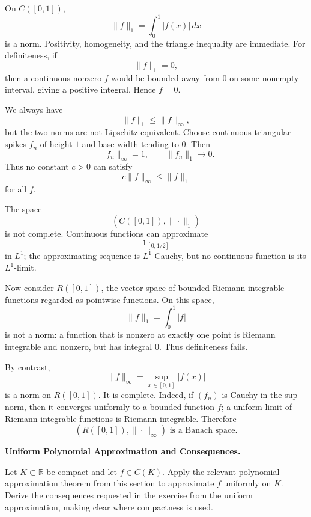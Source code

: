 \begin{solution}
On \(C([0,1])\),
\[
\|f\|_1=\int_0^1|f(x)|\,dx
\]
is a norm. Positivity, homogeneity, and the triangle inequality are immediate. For definiteness, if
\[
\|f\|_1=0,
\]
then a continuous nonzero \(f\) would be bounded away from \(0\) on some nonempty interval, giving a positive integral. Hence \(f=0\).

We always have
\[
\|f\|_1\le\|f\|_\infty,
\]
but the two norms are not Lipschitz equivalent. Choose continuous triangular spikes \(f_n\) of height \(1\) and base width tending to \(0\). Then
\[
\|f_n\|_\infty=1,
\qquad
\|f_n\|_1\longrightarrow0.
\]
Thus no constant \(c>0\) can satisfy
\[
c\|f\|_\infty\le\|f\|_1
\]
for all \(f\).

The space
\[
(C([0,1]),\|\cdot\|_1)
\]
is not complete. Continuous functions can approximate
\[
\mathbf1_{[0,1/2]}
\]
in \(L^1\); the approximating sequence is \(L^1\)-Cauchy, but no continuous function is its \(L^1\)-limit.

Now consider \(R([0,1])\), the vector space of bounded Riemann integrable functions regarded as pointwise functions. On this space,
\[
\|f\|_1=\int_0^1|f|
\]
is not a norm: a function that is nonzero at exactly one point is Riemann integrable and nonzero, but has integral \(0\). Thus definiteness fails.

By contrast,
\[
\|f\|_\infty=\sup_{x\in[0,1]}|f(x)|
\]
is a norm on \(R([0,1])\). It is complete. Indeed, if \((f_n)\) is Cauchy in the sup norm, then it converges uniformly to a bounded function \(f\); a uniform limit of Riemann integrable functions is Riemann integrable. Therefore
\[
\boxed{
(R([0,1]),\|\cdot\|_\infty)
\text{ is a Banach space}.
}
\]
\end{solution}


\begin{problem}[CP-II-0133]
\label{prob:cp-ii-0133}
\textbf{Uniform Polynomial Approximation and Consequences.}

\hspace*{1.5em}Let \(K\subset\mathbb R\) be compact and let \(f\in C(K)\). Apply the relevant
polynomial approximation theorem from this section to approximate \(f\)
uniformly on \(K\). Derive the consequences requested in the exercise from the
uniform approximation, making clear where compactness is used.
\end{problem}

